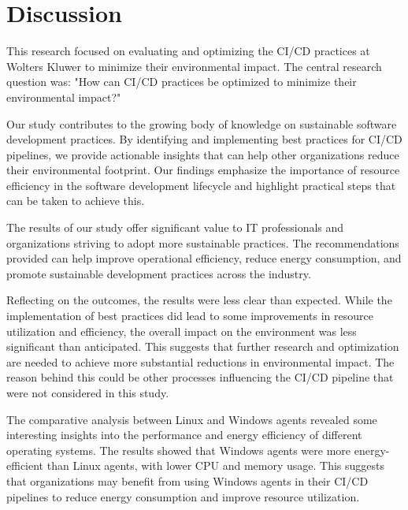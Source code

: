 
\chapter{Discussion}%
\label{ch:discussion}


This research focused on evaluating and optimizing the CI/CD practices at Wolters Kluwer to minimize their environmental impact. The central research question was: "How can CI/CD practices be optimized to minimize their environmental impact?"

Our study contributes to the growing body of knowledge on sustainable software development practices. By identifying and implementing best practices for CI/CD pipelines, we provide actionable insights that can help other organizations reduce their environmental footprint. Our findings emphasize the importance of resource efficiency in the software development lifecycle and highlight practical steps that can be taken to achieve this.

The results of our study offer significant value to IT professionals and organizations striving to adopt more sustainable practices. The recommendations provided can help improve operational efficiency, reduce energy consumption, and promote sustainable development practices across the industry.

Reflecting on the outcomes, the results were less clear than expected. While the implementation of best practices did lead to some improvements in resource utilization and efficiency, the overall impact on the environment was less significant than anticipated. This suggests that further research and optimization are needed to achieve more substantial reductions in environmental impact. The reason behind this could be other processes influencing the CI/CD pipeline that were not considered in this study.

The comparative analysis between Linux and Windows agents revealed some interesting insights into the performance and energy efficiency of different operating systems. The results showed that Windows agents were more energy-efficient than Linux agents, with lower CPU and memory usage. This suggests that organizations may benefit from using Windows agents in their CI/CD pipelines to reduce energy consumption and improve resource utilization.

